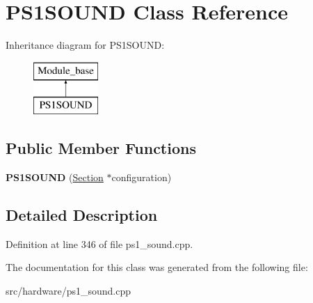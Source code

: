 \hypertarget{classPS1SOUND}{\section{P\-S1\-S\-O\-U\-N\-D Class Reference}
\label{classPS1SOUND}
}
Inheritance diagram for P\-S1\-S\-O\-U\-N\-D\-:\begin{figure}[H]
\begin{center}
\leavevmode
\includegraphics[height=2.000000cm]{classPS1SOUND}
\end{center}
\end{figure}
\subsection*{Public Member Functions}
\begin{DoxyCompactItemize}
\item 
\hypertarget{classPS1SOUND_a0f344bb539a95ca1f5036ba76cc6a5eb}{{\bfseries P\-S1\-S\-O\-U\-N\-D} (\hyperlink{classSection}{Section} $\ast$configuration)}\label{classPS1SOUND_a0f344bb539a95ca1f5036ba76cc6a5eb}

\end{DoxyCompactItemize}


\subsection{Detailed Description}


Definition at line 346 of file ps1\-\_\-sound.\-cpp.



The documentation for this class was generated from the following file\-:\begin{DoxyCompactItemize}
\item 
src/hardware/ps1\-\_\-sound.\-cpp\end{DoxyCompactItemize}
